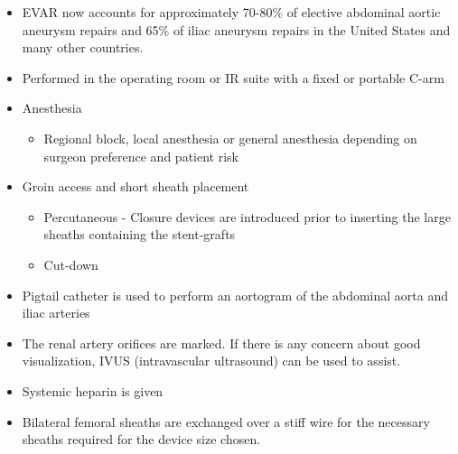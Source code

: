 \documentclass[
]{book}
\providecommand{\tightlist}{%
  \setlength{\itemsep}{0pt}\setlength{\parskip}{0pt}}
\begin{document}
\begin{itemize}
\item
  EVAR now accounts for approximately 70-80\% of elective abdominal
  aortic aneurysm repairs and 65\% of iliac aneurysm repairs in the
  United States and many other countries.
\item
  Performed in the operating room or IR suite with a fixed or portable
  C-arm
\item
  Anesthesia

  \begin{itemize}
  \tightlist
  \item
    Regional block, local anesthesia or general anesthesia depending
    on surgeon preference and patient risk
  \end{itemize}
\item
  Groin access and short sheath placement

  \begin{itemize}
  \item
    Percutaneous - Closure devices are introduced prior to inserting
    the large sheaths containing the stent-grafts
  \item
    Cut-down
  \end{itemize}
\item
  Pigtail catheter is used to perform an aortogram of the abdominal
  aorta and iliac arteries
\item
  The renal artery orifices are marked. If there is any concern about
  good visualization, IVUS (intravascular ultrasound) can be used to
  assist.
\item
  Systemic heparin is given
\item
  Bilateral femoral sheaths are exchanged over a stiff wire for the
  necessary sheaths required for the device size chosen.


\end{itemize}
\end{document}
